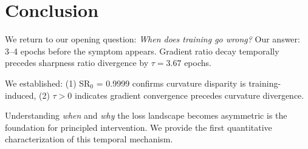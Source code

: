 \section{Conclusion}

We return to our opening question: \emph{When does training go wrong?} Our answer: 3--4 epochs before the symptom appears. Gradient ratio decay temporally precedes sharpness ratio divergence by $\tau = 3.67$ epochs.

We established: (1) SR$_0$ = 0.9999 confirms curvature disparity is training-induced, (2) $\tau > 0$ indicates gradient convergence precedes curvature divergence.

Understanding \emph{when} and \emph{why} the loss landscape becomes asymmetric is the foundation for principled intervention. We provide the first quantitative characterization of this temporal mechanism.
